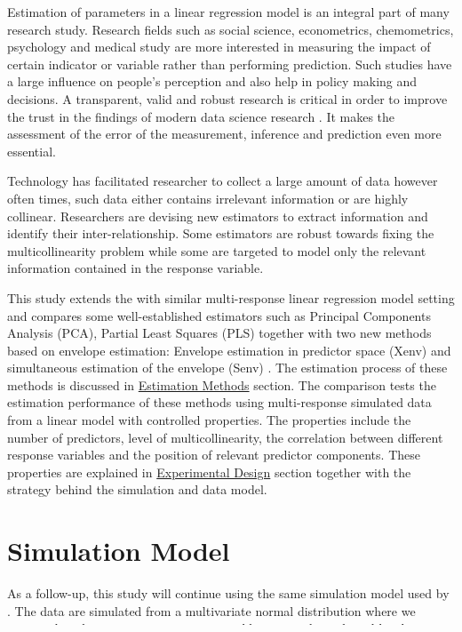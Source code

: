 \documentclass[12pt,3p,authoryear]{elsarticle}
\begin{document}
Estimation of parameters in a linear regression model is an integral part of many research study. Research fields such as social science, econometrics, chemometrics, psychology and medical study are more interested in measuring the impact of certain indicator or variable rather than performing prediction. Such studies have a large influence on people's perception and also help in policy making and decisions. A transparent, valid and robust research is critical in order to improve the trust in the findings of modern data science research \citep{eu2019auethics}. It makes the assessment of the error of the measurement, inference and prediction even more essential.

Technology has facilitated researcher to collect a large amount of data however often times, such data either contains irrelevant information or are highly collinear. Researchers are devising new estimators to extract information and identify their inter-relationship. Some estimators are robust towards fixing the multicollinearity problem while some are targeted to model only the relevant information contained in the response variable.

This study extends the \citep{rimal2019pred} with similar multi-response linear regression model setting and compares some well-established estimators such as Principal Components Analysis (PCA), Partial Least Squares (PLS) together with two new methods based on envelope estimation: Envelope estimation in predictor space (Xenv) \citep{cook2010envelope} and simultaneous estimation of the envelope (Senv) \citep{cook2015simultaneous}. The estimation process of these methods is discussed in \protect\hyperlink{estimation-methods}{Estimation Methods} section. The comparison tests the estimation performance of these methods using multi-response simulated data from a linear model with controlled properties. The properties include the number of predictors, level of multicollinearity, the correlation between different response variables and the position of relevant predictor components. These properties are explained in \protect\hyperlink{experimental-design}{Experimental Design} section together with the strategy behind the simulation and data model.

\hypertarget{simulation-model}{%
\section{Simulation Model}\label{simulation-model}}

As a follow-up, this study will continue using the same simulation model used by \citet{rimal2019pred}. The data are simulated from a multivariate normal distribution where we assume that the variation in response variable \(\mathbf{y}\) is partly explained by the predictor variable \(\mathbf{x}\). However, in many situations, only a subspace of the predictor space is relevant for the variation in the response \(\mathbf{y}\). This space can be referred to as the relevant space of \(\mathbf{x}\) and the rest as irrelevant space. In a similar way, for a certain model, we can assume that a subspace in the response space exists and contains the information that the relevant space in predictor can explain (Figure \ref{fig:relevant-space}).
\end{document}
